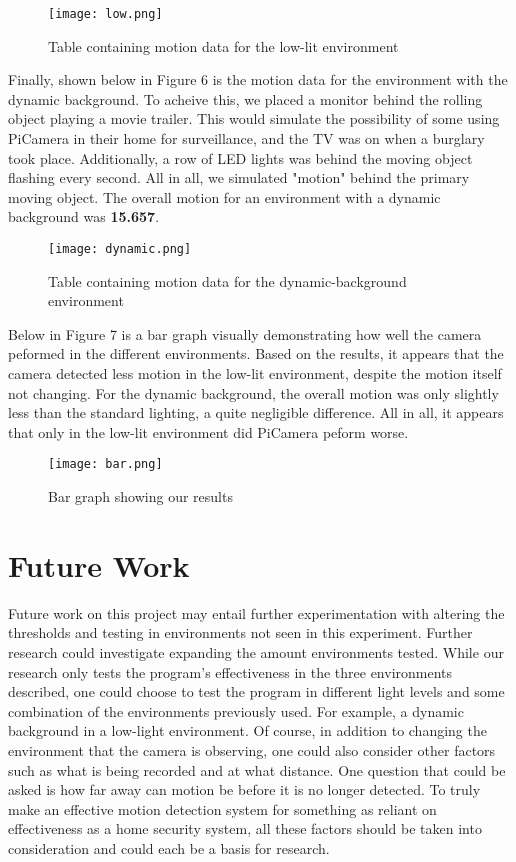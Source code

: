\documentclass[sigsmall]{acmart}
\begin{document}
\begin{figure}[h!]
	\texttt{[image: low.png]}
	\caption{Table containing motion data for the low-lit environment}
	\label{fig:low}
\end{figure}

Finally, shown below in Figure 6 is the motion data for the environment with the dynamic background. To acheive this, we placed a monitor behind the rolling object playing a movie trailer.  This would simulate the possibility of some using PiCamera in their home for surveillance, and the TV was on when a burglary took place.  Additionally, a row of LED lights was behind the moving object flashing every second.  All in all, we simulated "motion" behind the primary moving object.  The overall motion for an environment with a dynamic background was \textbf{15.657}.

\begin{figure}[h!]
	\texttt{[image: dynamic.png]}
	\caption{Table containing motion data for the dynamic-background environment}
	\label{fig:dynamic}
\end{figure}

Below in Figure 7 is a bar graph visually demonstrating how well the camera peformed in the different environments.  Based on the results, it appears that the camera detected less motion in the low-lit environment, despite the motion itself not changing.  For the dynamic background, the overall motion was only slightly less than the standard lighting, a quite negligible difference.  All in all, it appears that only in the low-lit environment did PiCamera peform worse.

\begin{figure}[h!]
	\texttt{[image: bar.png]}
	\caption{Bar graph showing our results}
	\label{fig:bar}
\end{figure}

\section*{Future Work}
Future work on this project may entail further experimentation with altering the thresholds and testing in environments not seen in this experiment. Further research could investigate expanding the amount environments tested. While our research only tests the program’s effectiveness in the three environments described, one could choose to test the program in different light levels and some combination of the environments previously used. For example, a dynamic background in a low-light environment. Of course, in addition to changing the environment that the camera is observing, one could also consider other factors such as what is being recorded and at what distance. One question that could be asked is how far away can motion be before it is no longer detected. To truly make an effective motion detection system for something as reliant on effectiveness as a home security system, all these factors should be taken into consideration and could each be a basis for research. 
\end{document}
